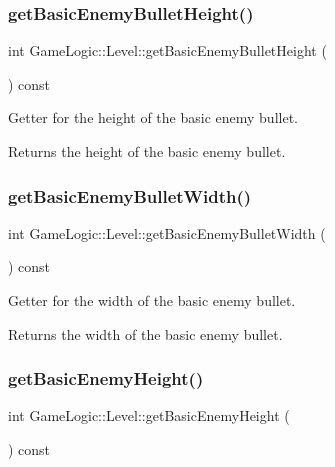 \subsubsection{\texorpdfstring{get\+Basic\+Enemy\+Bullet\+Height()}{getBasicEnemyBulletHeight()}}
{\footnotesize\ttfamily int Game\+Logic\+::\+Level\+::get\+Basic\+Enemy\+Bullet\+Height (\begin{DoxyParamCaption}{ }\end{DoxyParamCaption}) const}

Getter for the height of the basic enemy bullet. \begin{DoxyReturn}{Returns}
the height of the basic enemy bullet. 
\end{DoxyReturn}
\mbox{\label{classGameLogic_1_1Level_a3986fbece7460c76852b0455b433b06d}} 
\subsubsection{\texorpdfstring{get\+Basic\+Enemy\+Bullet\+Width()}{getBasicEnemyBulletWidth()}}
{\footnotesize\ttfamily int Game\+Logic\+::\+Level\+::get\+Basic\+Enemy\+Bullet\+Width (\begin{DoxyParamCaption}{ }\end{DoxyParamCaption}) const}

Getter for the width of the basic enemy bullet. \begin{DoxyReturn}{Returns}
the width of the basic enemy bullet. 
\end{DoxyReturn}
\mbox{\label{classGameLogic_1_1Level_a5ff5361f7a4f4ff3ac58c95dfdc2341a}} 
\subsubsection{\texorpdfstring{get\+Basic\+Enemy\+Height()}{getBasicEnemyHeight()}}
{\footnotesize\ttfamily int Game\+Logic\+::\+Level\+::get\+Basic\+Enemy\+Height (\begin{DoxyParamCaption}{ }\end{DoxyParamCaption}) const}

